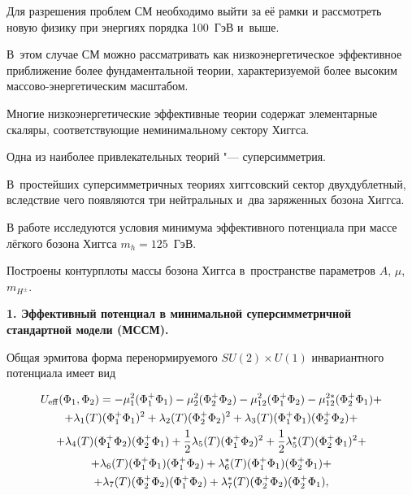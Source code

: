 Для разрешения проблем СМ необходимо выйти за её рамки и рассмотреть новую физику при энергиях порядка 100~ГэВ и~выше. 

В~этом случае СМ можно рассматривать как низкоэнергетическое эффективное приближение более фундаментальной теории, характеризуемой более высоким массово-энергетическим масштабом.



Многие низкоэнергетические эффективные теории содержат элементарные скаляры, соответствующие неминимальному сектору Хиггса. 

Одна из наиболее привлекательных теорий "--- суперсимметрия. 

В~простейших суперсимметричных теориях хиггсовский сектор двухдублетный, вследствие чего появляются три нейтральных и~два заряженных бозона Хиггса.



В работе исследуются условия минимума эффективного потенциала при массе лёгкого бозона Хиггса $m_h=125$~ГэВ. 

Построены контурплоты массы бозона Хиггса в~пространстве параметров $A$, $\mu$, $m_{H^\pm}$.



\smallskip





\textbf{1. Эффективный потенциал в минимальной суперсимметричной стандартной модели (МССМ).}

Общая эрмитова форма перенормируемого $SU(2) \times U(1)$ инвариантного потенциала имеет вид

\begin{multline}

U_{\rm eff} (\Phi_{1} ,\Phi_{2} )= 

 \label{ufull} -\mu _{1}^{2} (\Phi_{1}^{+} \Phi _{1} )-\mu _{2}^{2} (\Phi_{2}^{+} \Phi_{2} )-\mu _{12}^{2} (\Phi_{1}^{+} \Phi_{2} )-\mu _{12}^{2*} (\Phi_{2}^{+} \Phi_{1} )+ \\

 +

\lambda _{1} (T)(\Phi_{1}^{+} \Phi_{1} )^{2} +\lambda _{2} (T)(\Phi_{2}^{+} \Phi_{2} )^{2} +\lambda _{3} (T)(\Phi_{1}^{+} \Phi_{1} )(\Phi_{2}^{+} \Phi_{2} )+ \\ + \lambda _{4} (T)(\Phi_{1}^{+} \Phi_{2} )(\Phi_{2}^{+} \Phi_{1} )+

\frac{1}{2} \lambda _{5} (T)(\Phi_{1}^{+} \Phi_{2} )^{2} +\frac{1}{2} \lambda _{5}^{*} (T)(\Phi_{2}^{+} \Phi_{1} )^{2} + \\ + \lambda _{6} (T)(\Phi_{1}^{+} \Phi_{1} )(\Phi_{1}^{+} \Phi_{2} )+ \lambda _{6}^{*} (T)(\Phi_{1}^{+} \Phi_{1} )(\Phi_{2}^{+} \Phi_{1} )+\\ +

\lambda _{7} (T)(\Phi_{2}^{+} \Phi_{2} )(\Phi_{1}^{+} \Phi_{2} )+\lambda _{7}^{*} (T)(\Phi_{2}^{+} \Phi_{2} )(\Phi_{2}^{+} \Phi_{1} ),

\end{multline}

